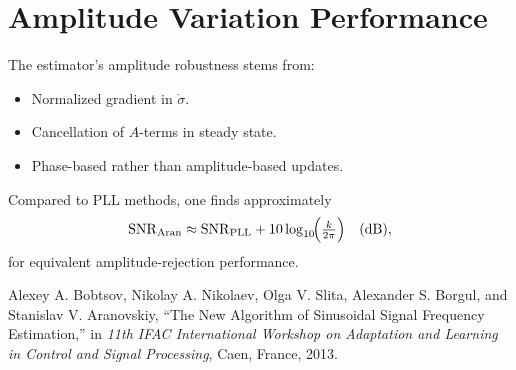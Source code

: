 \documentclass[12pt,letterpaper]{article}
\begin{document}
\section{Amplitude Variation Performance}

The estimator’s amplitude robustness stems from:
\begin{itemize}
  \item Normalized gradient in \(\dot{\sigma}\).
  \item Cancellation of \(A\)-terms in steady state.
  \item Phase-based rather than amplitude-based updates.
\end{itemize}

Compared to PLL methods, one finds approximately
\[
\mathrm{SNR}_{\text{Aran}} 
\approx \mathrm{SNR}_{\text{PLL}} 
+ 10\log_{10}\!\Bigl(\tfrac{k}{2\pi}\Bigr)
\quad\text{(dB)},
\]
for equivalent amplitude-rejection performance.

\begin{thebibliography}{9}
Alexey A. Bobtsov, Nikolay A. Nikolaev, Olga V. Slita, Alexander S. Borgul, and Stanislav V. Aranovskiy, 
``The New Algorithm of Sinusoidal Signal Frequency Estimation,'' 
in \emph{11th IFAC International Workshop on Adaptation and Learning in Control and Signal Processing}, 
Caen, France, 2013.
\end{thebibliography}
\end{document}
